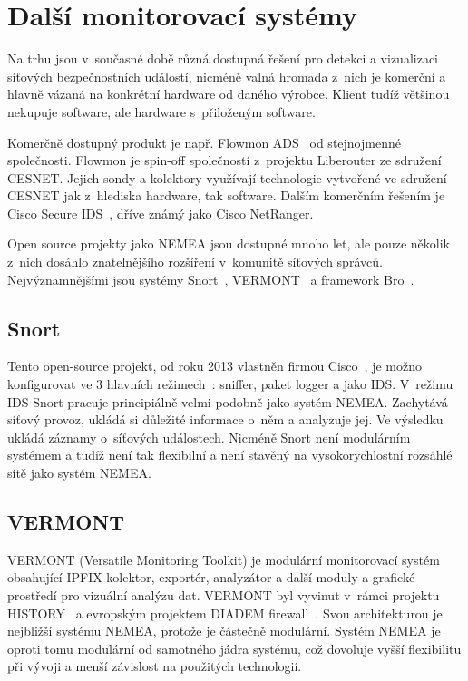 \section{Další monitorovací systémy}

Na trhu jsou v~současné době různá dostupná řešení pro detekci a vizualizaci síťových bezpečnostních událostí, nicméně valná hromada z~nich je komerční a hlavně vázaná na konkrétní hardware od daného výrobce. Klient tudíž většinou nekupuje software, ale hardware s~přiloženým software.

Komerčně dostupný produkt je např. Flowmon ADS~\cite{flowmon:report}\cite{flowmon:ads} od stejnojmenné společnosti. Flowmon je spin-off společností z~projektu Liberouter ze sdružení CESNET. Jejich sondy a kolektory využívají technologie vytvořené ve sdružení CESNET jak z~hlediska hardware, tak software. Dalším komerčním řešením je Cisco Secure IDS~\cite{cisco:ids}, dříve známý jako Cisco NetRanger.

Open source projekty jako NEMEA jsou dostupné mnoho let, ale pouze několik z~nich dosáhlo znatelnějšího rozšíření v~komunitě síťových správců. Nejvýznamnějšími jsou systémy Snort~\cite{snort}, VERMONT~\cite{vermont} a framework Bro~\cite{bro}. 

\subsection*{Snort}
Tento open-source projekt, od roku 2013 vlastněn firmou Cisco~\cite{snort:cisco}, je možno konfigurovat ve 3 hlavních režimech~\cite{snort:modes}: sniffer, paket logger a jako IDS. V~režimu IDS Snort pracuje principiálně velmi podobně jako systém NEMEA. Zachytává síťový provoz, ukládá si důležité informace o~něm a analyzuje jej. Ve výsledku ukládá záznamy o~síťových událostech. Nicméně Snort není modulárním systémem a tudíž není tak flexibilní a není stavěný na vysokorychlostní rozsáhlé sítě jako systém NEMEA.

\subsection*{VERMONT}

VERMONT (Versatile Monitoring Toolkit) je modulární monitorovací systém obsahující IPFIX kolektor, exportér, analyzátor a další moduly a grafické prostředí pro vizuální analýzu dat. VERMONT byl vyvinut v~rámci projektu HISTORY~\cite{vermont:history} a evropským projektem DIADEM firewall~\cite{vermont:diadem}. Svou architekturou je nejbližší systému NEMEA, protože je částečně modulární. Systém NEMEA je oproti tomu modulární od samotného jádra systému, což dovoluje vyšší flexibilitu při vývoji a menší závislost na použitých technologií.

